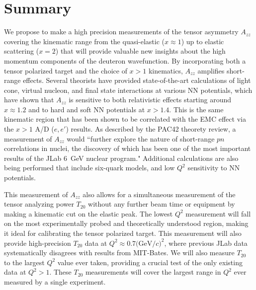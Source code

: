 \section{Summary}


We propose to make a high precision measurements of the tensor asymmetry $A_{zz}$ covering the kinematic range from the quasi-elastic ($x\approx 1$) up to elastic scattering ($x=2$) that will provide valuable new insights about the high momentum components of the deuteron wavefunction. By incorporating both a tensor polarized target and the choice of $x>1$ kinematics, $A_{zz}$ amplifies short-range effects. Several theorists have provided state-of-the-art calculations of light cone, virtual nucleon, and final state interactions at various NN potentials, which have shown that $A_{zz}$ is sensitive to both relativistic effects starting around $x\approx1.2$ and to hard and soft NN potentials at $x>1.4$. This is the same kinematic region that has been shown to be correlated with the EMC effect via the $x>1$ A/D ($e,e'$) results. As described by the PAC42 theorety review, a measurement of $A_{zz}$ would ``further explore the nature of short-range $pn$ correlations in nuclei, the discovery of which has been one of the most important results of the JLab 6~GeV nuclear program." Additional calculations are also being performed that include six-quark models, and low $Q^2$ sensitivity to NN potentials.   

This measurement of $A_{zz}$ also allows for a simultaneous measurement of the tensor analyzing power $T_{20}$ without any further beam time or equipment by making a kinematic cut on the elastic peak. The lowest $Q^2$ measurement will fall on the most experimentally probed and theoretically understood region, making it ideal for calibrating the tensor polarized target. This measurement will also provide high-precision $T_{20}$ data at $Q^2\approx0.7\mathrm{(GeV/}c)^2$, where previous JLab data systematically disagrees with results from MIT-Bates. We will also measure $T_{20}$ to the largest $Q^2$ value ever taken, providing a crucial test of the only existing data at $Q^2>1$. These $T_{20}$ measurements will cover the largest range in $Q^2$ ever measured by a single experiment.



